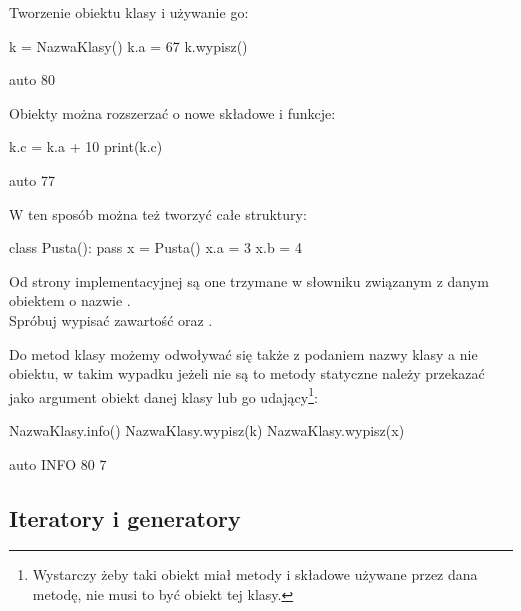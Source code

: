 \documentclass{pdfBooklets}
\begin{document}
Tworzenie obiektu klasy i używanie go:

\begin{CodeFrame}[python]{0.55\textwidth}
k = NazwaKlasy()
k.a = 67
k.wypisz()
\end{CodeFrame}
\begin{CodeFrame}{auto}
80
\end{CodeFrame}

Obiekty można rozszerzać o nowe składowe i funkcje:

\begin{CodeFrame}[python]{0.55\textwidth}
k.c = k.a + 10
print(k.c)
\end{CodeFrame}
\begin{CodeFrame}{auto}
77
\end{CodeFrame}

W ten sposób można też tworzyć całe struktury:\\
\begin{CodeFrame}[python]{0.55\textwidth}
class Pusta():
  pass
x = Pusta()
x.a = 3
x.b = 4
\end{CodeFrame}
\begin{minipage}[t]{0.4\textwidth}
\vspace{6pt}Od strony implementacyjnej są one trzymane w słowniku związanym z danym obiektem o nazwie .\\
Spróbuj wypisać zawartość  oraz .
\end{minipage}

Do metod klasy możemy odwoływać się także z podaniem nazwy klasy a nie obiektu, w takim wypadku jeżeli nie są to metody statyczne należy przekazać jako argument obiekt danej klasy
lub go udający\footnote{
Wystarczy żeby taki obiekt miał metody i składowe używane przez dana metodę, nie musi to być obiekt tej klasy.
}:

\begin{CodeFrame}[python]{0.55\textwidth}
NazwaKlasy.info()
NazwaKlasy.wypisz(k)
NazwaKlasy.wypisz(x)
\end{CodeFrame}
\begin{CodeFrame}{auto}
INFO
80
7
\end{CodeFrame}

\vspace{-13pt}

\subsection{Iteratory i generatory {\Symbola 🤔}}
\end{document}
